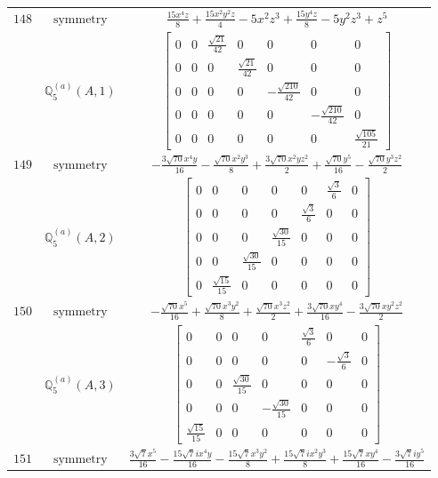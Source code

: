 \documentclass[fleqn,8pt,landscape]{jsarticle}
\begin{document}
\begin{longtable}{ccc}
$ 148 $ & $ \text{symmetry} $ & $ \frac{15 x^{4} z}{8} + \frac{15 x^{2} y^{2} z}{4} - 5 x^{2} z^{3} + \frac{15 y^{4} z}{8} - 5 y^{2} z^{3} + z^{5} $ \\
$  $ & $ \mathbb{Q}_{5}^{(a)}(A,1) $ & $ \begin{bmatrix} 0 & 0 & \frac{\sqrt{21}}{42} & 0 & 0 & 0 & 0 \\ 0 & 0 & 0 & \frac{\sqrt{21}}{42} & 0 & 0 & 0 \\ 0 & 0 & 0 & 0 & - \frac{\sqrt{210}}{42} & 0 & 0 \\ 0 & 0 & 0 & 0 & 0 & - \frac{\sqrt{210}}{42} & 0 \\ 0 & 0 & 0 & 0 & 0 & 0 & \frac{\sqrt{105}}{21} \end{bmatrix} $ \\ \hline
$ 149 $ & $ \text{symmetry} $ & $ - \frac{3 \sqrt{70} x^{4} y}{16} - \frac{\sqrt{70} x^{2} y^{3}}{8} + \frac{3 \sqrt{70} x^{2} y z^{2}}{2} + \frac{\sqrt{70} y^{5}}{16} - \frac{\sqrt{70} y^{3} z^{2}}{2} $ \\
$  $ & $ \mathbb{Q}_{5}^{(a)}(A,2) $ & $ \begin{bmatrix} 0 & 0 & 0 & 0 & 0 & \frac{\sqrt{3}}{6} & 0 \\ 0 & 0 & 0 & 0 & \frac{\sqrt{3}}{6} & 0 & 0 \\ 0 & 0 & 0 & \frac{\sqrt{30}}{15} & 0 & 0 & 0 \\ 0 & 0 & \frac{\sqrt{30}}{15} & 0 & 0 & 0 & 0 \\ 0 & \frac{\sqrt{15}}{15} & 0 & 0 & 0 & 0 & 0 \end{bmatrix} $ \\ \hline
$ 150 $ & $ \text{symmetry} $ & $ - \frac{\sqrt{70} x^{5}}{16} + \frac{\sqrt{70} x^{3} y^{2}}{8} + \frac{\sqrt{70} x^{3} z^{2}}{2} + \frac{3 \sqrt{70} x y^{4}}{16} - \frac{3 \sqrt{70} x y^{2} z^{2}}{2} $ \\
$  $ & $ \mathbb{Q}_{5}^{(a)}(A,3) $ & $ \begin{bmatrix} 0 & 0 & 0 & 0 & \frac{\sqrt{3}}{6} & 0 & 0 \\ 0 & 0 & 0 & 0 & 0 & - \frac{\sqrt{3}}{6} & 0 \\ 0 & 0 & \frac{\sqrt{30}}{15} & 0 & 0 & 0 & 0 \\ 0 & 0 & 0 & - \frac{\sqrt{30}}{15} & 0 & 0 & 0 \\ \frac{\sqrt{15}}{15} & 0 & 0 & 0 & 0 & 0 & 0 \end{bmatrix} $ \\ \hline
$ 151 $ & $ \text{symmetry} $ & $ \frac{3 \sqrt{7} x^{5}}{16} - \frac{15 \sqrt{7} i x^{4} y}{16} - \frac{15 \sqrt{7} x^{3} y^{2}}{8} + \frac{15 \sqrt{7} i x^{2} y^{3}}{8} + \frac{15 \sqrt{7} x y^{4}}{16} - \frac{3 \sqrt{7} i y^{5}}{16} $ \\

\end{longtable}
\end{document}

